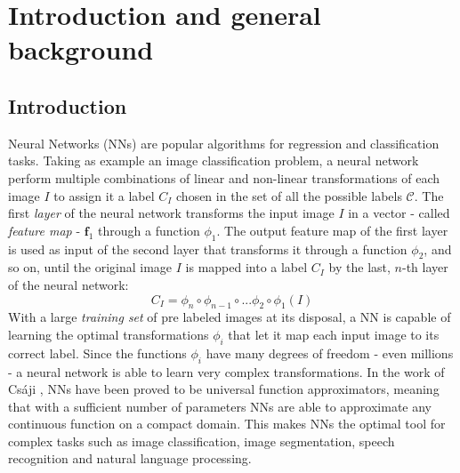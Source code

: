 

\setcounter{page}{1}



\section {Introduction and general background} 

\subsection{Introduction}

Neural Networks (NNs) are popular algorithms for regression and classification tasks. Taking as example an image classification problem, a neural network perform multiple combinations of linear and non-linear transformations of each image $I$ to assign it a label $C_I$ chosen in the set of all the possible labels $\mathcal C$. The first \textit{layer} of the neural network transforms the input image $I$ in a vector - called \textit{feature map} - $\mathbf f_1$ through a function $\phi_1$.  The output feature map of the first layer is used as input of the second layer that transforms it through a function $\phi_2$, and so on, until the original image $I$ is mapped into a label $C_I$ by the last, $n$-th layer of the neural network:
$$C_I = \phi_n \circ \phi_{n-1}\circ ... \phi_2\circ\phi_1 (I)$$
 With a large \textit{training set} of pre labeled images at its disposal, a NN is capable of learning the optimal transformations $\phi_i$ that let it map each input image to its correct label. Since the functions $\phi_i$ have many degrees of freedom - even millions - a neural network is able to learn very complex transformations. In the work of Cs\'aji \cite{NN}, NNs have been proved to be universal function approximators, meaning that with a sufficient number of parameters NNs are able to approximate any continuous function on a compact domain. This makes NNs the optimal tool for complex tasks such as image classification, image segmentation, speech recognition and natural language processing.
 
